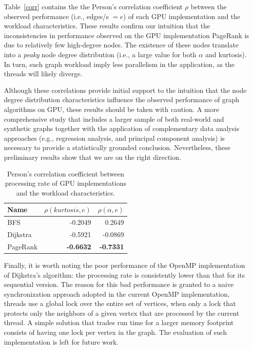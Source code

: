 Table~\ref{corr} contains the the Person's correlation coefficient $\rho$ between the observed performance (i.e., edges/s $= e$) of each GPU implementation and the workload characteristics. These results confirm our intuition that the inconsistencies in performance observed on the GPU implementation PageRank is due to relatively few high-degree nodes. The existence of these nodes translate into a {\em peaky} node degree distribution (i.e., a large value for both $\alpha$ and kurtosis). In turn, such graph workload imply less parallelism in the application, as the threads will likely diverge. 

Although these correlations provide initial support to the intuition that the node degree distribution characteristics influence the observed performance of graph algorithms on GPU, these results should be taken with caution. A more comprehensive study that includes a larger sample of both real-world and synthetic graphs together with the application of complementary data analysis approaches (e.g., regression analysis, and principal component analysis) is necessary to provide a statistically grounded conclusion. Nevertheless, these preliminary results show that we are on the right direction.

\begin{table}[ht]
\centering
\begin{tabular}{l|r|r}
Name     & $\rho(kurtosis,e)$ & $\rho(\alpha,e)$ \\\hline
BFS      & -0.2049       &  0.2649 \\\hline
Dijkstra & -0.5921       & -0.0869 \\\hline
PageRank & {\bf -0.6632} & {\bf -0.7331} \\\hline
\end{tabular}
\caption{Person's correlation coefficient between processing rate of GPU implementations and the workload characteristics.}
\label{tab:corr}
\end{table}

Finally, it is worth noting the poor performance of the OpenMP implementation of Dijkstra's algorithm: the processing rate is consistently lower than that for its sequential version. The reason for this bad performance is granted to a naive synchronization approach adopted in the current OpenMP implementation, threads use a global lock over the entire set of vertices, when only a lock that protects only the neighbors of a given vertex that are processed by the current thread. A simple solution that trades run time for a larger memory footprint consists of having one lock per vertex in the graph. The evaluation of such implementation is left for future work.
